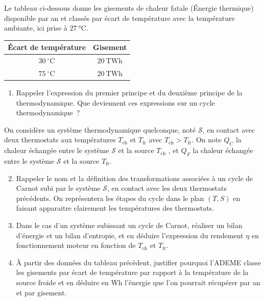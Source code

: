 \documentclass[a4paper, 12pt, garamond]{book}
\begin{document}
Le tableau ci-dessous donne les gisements de chaleur fatale (Énergie
thermique) disponible par an et classés par écart de température avec la
température ambiante, ici prise à $\SI{27}{\degreeCelsius}$.

\begin{center}
	\begin{tabular}{cc}
		\toprule
		Écart de température     & Gisement
		\\
		\midrule
		\(30\ ^\circ\mathrm{C}\) & \(20\ \mathrm{TWh}\)
		\\
		\(75\ ^\circ\mathrm{C}\) & \(20\ \mathrm{TWh}\)
		\\
		\bottomrule
	\end{tabular}
\end{center}

\begin{enumerate}
	\item
	      Rappeler l'expression du premier principe et du deuxième principe de
	      la thermodynamique. Que deviennent ces expressions sur un cycle
	      thermodynamique~?
\end{enumerate}

On considère un système thermodynamique quelconque, noté
\(\mathcal{S}\), en contact avec deux thermostats aux températures
\(T_\mathrm{ch}\) et \(T_\mathrm{fr}\) avec
\(T_\mathrm{ch} > T_\mathrm{fr}\). On note \(Q_C\) la chaleur échangée
entre le système \(\mathcal{S}\) et la source \(T_\mathrm{ch}\) , et
\(Q_F\) la chaleur échangée entre le système \(\mathcal{S}\) et la
source \(T_\mathrm{fr}\).

\begin{enumerate}
	\setcounter{enumi}{1}
	\item
	      Rappeler le nom et la définition des transformations associées à un
	      cycle de Carnot subi par le système \(\mathcal{S}\), en contact avec
	      les deux thermostats précédents. On représentera les étapes du cycle
	      dans le plan \((T,S)\) en faisant apparaitre clairement les
	      températures des thermostats.
	\item
	      Dans le cas d'un système subissant un cycle de Carnot, réaliser un
	      bilan d'énergie et un bilan d'entropie, et en déduire l'expression du
	      rendement \(\eta\) en fonctionnement moteur en fonction de
	      \(T_\mathrm{ch}\) et \(T_\mathrm{fr}\).
	\item
	      À partir des données du tableau précèdent, justifier pourquoi l'ADEME
	      classe les gisements par écart de température par rapport à la
	      température de la source froide et en déduire en Wh l'énergie que l'on
	      pourrait récupérer par an et par gisement.
\end{enumerate}
\end{document}
